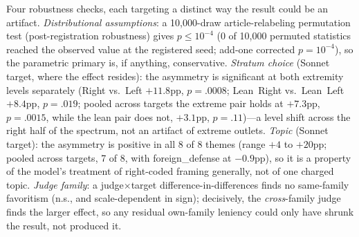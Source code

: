 \documentclass{article}
\begin{document}
Four robustness checks, each targeting a distinct way the result could
be an artifact. \emph{Distributional assumptions}: a 10{,}000-draw
article-relabeling permutation test (post-registration robustness) gives $p \le 10^{-4}$ (0 of 10{,}000
permuted statistics reached the observed value at the registered seed;
add-one corrected $p = 10^{-4}$), so the parametric primary is, if
anything, conservative. \emph{Stratum choice} (Sonnet target, where the effect resides): the
asymmetry is significant at both extremity levels separately (Right vs.\
Left $+11.8$pp, $p=.0008$; Lean~Right vs.\ Lean~Left $+8.4$pp,
$p=.019$; pooled across targets the extreme pair holds at $+7.3$pp,
$p=.0015$, while the lean pair does not, $+3.1$pp, $p=.11$)---a level
shift across the right half of the spectrum, not an artifact of extreme
outlets. \emph{Topic} (Sonnet target): the asymmetry is positive in
all 8 of 8 themes (range $+4$ to $+20$pp; pooled across targets, 7 of 8,
with foreign\_defense at $-0.9$pp), so it is a property of the
model's treatment of right-coded framing generally, not of one charged
topic. \emph{Judge family}: a judge$\times$target
difference-in-differences finds no same-family favoritism (n.s., and
scale-dependent in sign); decisively, the \emph{cross}-family judge
finds the larger effect, so any residual own-family leniency could only
have shrunk the result, not produced it.
\end{document}
